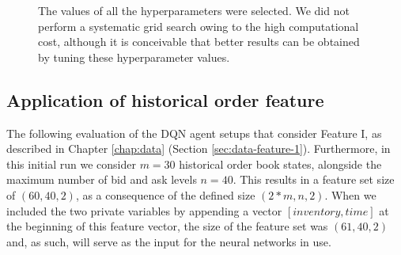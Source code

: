 \begin{figure}[H]
    \centering
    \caption{The values of all the hyperparameters were selected. We did not perform a systematic grid search owing to the high computational cost, although it is conceivable that better results can be obtained by tuning these hyperparameter values.}
    \label{fig:eval-dqn-hyperparameters}
\end{figure}

\subsection{Application of historical order feature}

The following evaluation of the DQN agent setups that consider Feature I, as described in Chapter \ref{chap:data} (Section \ref{sec:data-feature-1}).
Furthermore, in this initial run we consider $m=30$ historical order book states, alongside the maximum number of bid and ask levels $n=40$.
This results in a feature set size of $(60, 40, 2)$, as a consequence of the defined size $(2*m, n, 2)$.
When we included the two private variables by appending a vector $[inventory, time]$ at the beginning of this feature vector, the size of the feature set was $(61, 40, 2)$ and, as such, will serve as the input for the neural networks in use.

